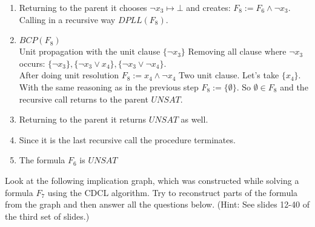\documentclass[addpoints,12pt]{exam}
\begin{document}
\begin{questions}
\begin{enumerate}
    \item Returning to the parent it chooses $\neg x_3\mapsto \bot$ and creates: $F_8:=F_6 \land \neg x_3$. Calling in a recursive way $DPLL(F_8).$
    \item $BCP(F_8)$ \\
    Unit propagation with the unit clause $\{\neg x_3\}$
    Removing all clause where $\neg x_3$ occurs: $\{\neg x_3\},\{\neg x_3 \lor x_4\},\{\neg x_3 \lor \neg x_4\}$.\\
    After doing unit resolution $F_8:= x_4 \land \neg x_4$
    Two unit clause. Let's take $\{x_4\}$.
    With the same reasoning as in the previous step $F_8:=\{\emptyset\}$.
    So $\emptyset \in F_8$ and the recursive call returns to the parent $UNSAT$.
    \item Returning to the parent it returns $UNSAT$ as well.
    \item Since it is the last recursive call the procedure terminates.
    \item The formula $F_6$ is $UNSAT$
\end{enumerate}
\newpage
\question[20]
\vspace*{5pt}

Look at the following implication graph, which was constructed while solving a formula $F_7$ using the CDCL algorithm.
Try to reconstruct parts of the formula from the graph and then answer all the questions below.
(Hint: See slides 12-40 of the third set of slides.)
\vspace*{10pt}


\end{questions}
\end{document}
